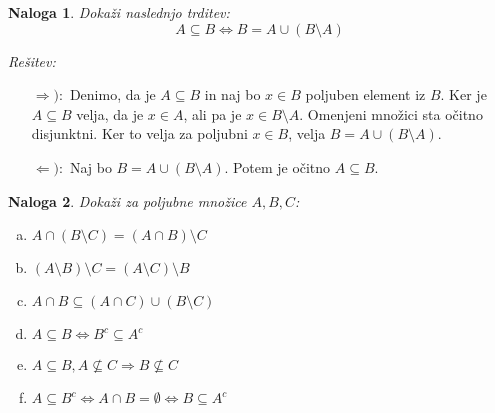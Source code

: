 \documentclass[a4paper, 10pt]{article}
\newtheorem{nal}{Naloga}
\newenvironment{resitev}{\begin{flushleft}\textit{Rešitev:}}{\hfill\end{flushleft}}
\begin{document}
	\begin{nal}
		Dokaži naslednjo trditev:\[
		A \subseteq B \iff B = A \cup (B\setminus A)\]
	\end{nal}
	\begin{resitev}
		\begin{itemize}
			\item[$\Rightarrow):$] Denimo, da je $A\subseteq B$ in naj bo $x\in B$ poljuben element iz $B$. Ker je $A\subseteq B$ velja, da je $x\in A$, ali pa je $x\in B\setminus A$. Omenjeni množici sta očitno disjunktni. Ker to velja za poljubni $x\in B$, velja $B = A\cup (B\setminus A)$.
			\item[$\Leftarrow):$] Naj bo $B = A \cup (B\setminus A)$. Potem je očitno $A\subseteq B$.
		\end{itemize}
	\end{resitev}
	\begin{nal}
		Dokaži za poljubne množice $A, B, C$:
		\begin{enumerate}[a)]
			\item $A\cap (B\setminus C) = (A\cap B)\setminus C$
			\item $(A\setminus B)\setminus C = (A\setminus C)\setminus B$
			\item $A\cap B \subseteq (A\cap C)\cup (B\setminus C)$
			\item $A\subseteq B \iff B^c\subseteq A^c$
			\item $A\subseteq B, A\nsubseteq C \Rightarrow B \nsubseteq C$
			\item $A\subseteq B^c \iff A \cap B = \emptyset \iff B \subseteq A^c$
		\end{enumerate}
	\end{nal}
\end{document}
